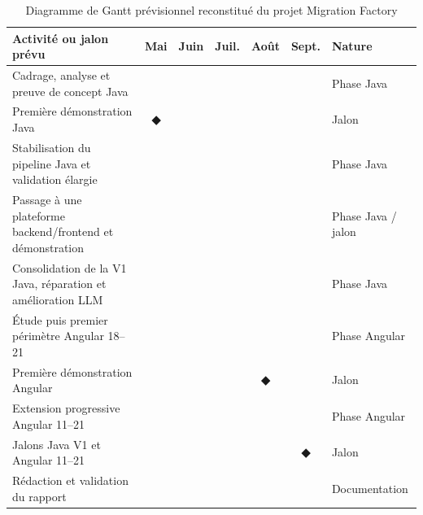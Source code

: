 \scriptsize
\begin{table}[H]
    \centering
    \caption{Diagramme de Gantt prévisionnel reconstitué du projet Migration Factory}
    \label{tab:gantt-previsionnel-ch1}
    \begin{tabularx}{\textwidth}{|>{\RaggedRight\arraybackslash}p{4.9cm}|c|c|c|c|c|>{\RaggedRight\arraybackslash}X|}
        \hline
        \rowcolor{cgilight!95}
        \textbf{Activité ou jalon prévu} & \textbf{Mai} & \textbf{Juin} & \textbf{Juil.} & \textbf{Août} & \textbf{Sept.} & \textbf{Nature} \\
        \hline
        Cadrage, analyse et preuve de concept Java & \cellcolor{cgiblue!50} & & & & & Phase Java \\
        \hline
        Première démonstration Java & \cellcolor{cgired!25}\textbf{◆} & & & & & Jalon \\
        \hline
        Stabilisation du pipeline Java et validation élargie & \cellcolor{cgiblue!35} & \cellcolor{cgiblue!50} & & & & Phase Java \\
        \hline
        Passage à une plateforme backend/frontend et démonstration & & \cellcolor{cgiblue!50} & & & & Phase Java / jalon \\
        \hline
        Consolidation de la V1 Java, réparation et amélioration LLM & & \cellcolor{cgiblue!35} & \cellcolor{cgiblue!50} & \cellcolor{cgiblue!50} & \cellcolor{cgiblue!25} & Phase Java \\
        \hline
        Étude puis premier périmètre Angular 18--21 & & & \cellcolor{emsigreen!35} & \cellcolor{emsigreen!35} & & Phase Angular \\
        \hline
        Première démonstration Angular & & & & \cellcolor{cgired!25}\textbf{◆} & & Jalon \\
        \hline
        Extension progressive Angular 11--21 & & & & \cellcolor{emsigreen!25} & \cellcolor{emsigreen!35} & Phase Angular \\
        \hline
        Jalons Java V1 et Angular 11--21 & & & & & \cellcolor{cgired!25}\textbf{◆} & Jalon \\
        \hline
        Rédaction et validation du rapport & & & \cellcolor{cgigray!20} & \cellcolor{cgigray!30} & \cellcolor{cgigray!20} & Documentation \\
        \hline
    \end{tabularx}
\end{table}
\normalsize

\begin{center}
\end{center}

